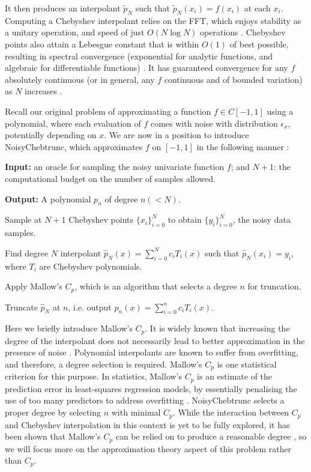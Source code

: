 \documentclass[pdflatex,sn-mathphys-num]{sn-jnl}%
\theoremstyle{thmstyleone}%
\theoremstyle{thmstyletwo}%
\theoremstyle{thmstylethree}%
\begin{document}
It then produces an interpolant $\tilde{p}_{N}$ such that $\tilde{p}_{N}(x_i) = f(x_i) $ at each $x_i$. Computing a Chebyshev interpolant relies on the FFT, which enjoys stability as a unitary operation, and speed of just $O(N\log N)$ operations \cite{FFT-Cheb}. Chebyshev points also attain a Lebesgue constant that is within $O(1)$ of best possible, resulting in spectral convergence (exponential for analytic functions, and algebraic for differentiable functions) \cite{ATAP}.  It has guaranteed convergence for any $f$ absolutely continuous (or in general, any $f$ continuous and of bounded variation) as $N$ increases \cite{abs-cont}.


Recall our original problem of approximating a function $f \in C[-1,1]$ using a polynomial, where each evaluation of $f$ comes with noise with distribution $\epsilon_x$, potentially depending on $x$.  We are now in a position to introduce NoisyChebtrunc, which approximates $f$  on $[-1,1]$ in the following manner \cite{yuji}:


\begin{algorithm}
	\caption{NoisyChebtrunc: for approximation of $f$ under i.i.d. noise.}\label{alg:noisychebtrunc}
	\textbf{Input:} an oracle for sampling the noisy univariate function $f$; and $N+1$: the computational budget on the number of samples allowed.
	
	\textbf{Output:} A polynomial $p_n$ of degree $n( < N)$. 
	\begin{algorithmic}[1]
		\item Sample at $N+1$ Chebyshev points $ \{x_i\}_{i=0}^N $ to obtain $\{y_i\}_{i=0}^N$, the noisy data samples.
		\item Find degree $N$ interpolant $\hat{p}_N(x) = \sum_{i=0}^{N}c_iT_i(x)$ such that $\hat{p}_N(x_i) = y_i$, where $T_i$ are Chebyshev polynomials.
		\item Apply Mallow's $C_p$, which is an algorithm that selects a degree $n$ for truncation. 
		\item Truncate $\hat{p}_N$ at $n$, i.e. output $p_n(x) = \sum_{i=0}^{n}c_iT_i(x)$.
	\end{algorithmic}
\end{algorithm}

Here we briefly introduce Mallow's $C_p$. It is widely known that increasing the degree of the interpolant does not necessarily lead to better approximation in the presence of noise \cite{davenport}. Polynomial interpolants are known to suffer from overfitting, and therefore, a degree selection is required. Mallow's $C_p$ is one statistical criterion for this purpose. In statistics, Mallow's $C_p$ is an estimate of the prediction error in least-squares regression models, by essentially penalising the use of too many predictors to address overfitting \cite[Chap. 6]{stats}. NoisyChebtrunc selects a proper degree by selecting $n$ with minimal $C_p$. While the interaction between $C_p$ and Chebyshev interpolation in this context is yet to be fully explored, it has been shown that Mallow's $C_p$ can be relied on to produce a reasonable degree \cite{yuji}, so we will focus more on the approximation theory aspect of this problem rather than $C_p$.
\end{document}
